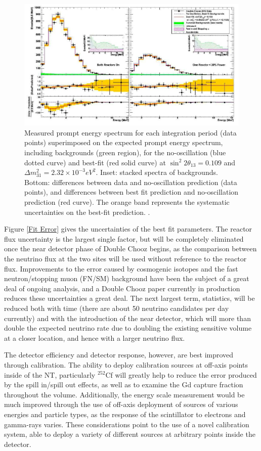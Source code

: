  \begin{figure}
 \includegraphics[width = \textwidth]{DC_Results/Best_Fit.jpg}
 \caption{Measured prompt energy spectrum for each integration period (data points) superimposed on the expected prompt
energy spectrum, including backgrounds (green region), for the no-oscillation (blue dotted curve) and best-fit (red solid curve)
at $\sin^2 2 \theta_{13} = 0.109$ and $\Delta m^2_{31}= 2.32 \times 10^{-3} eV^2$. Inset: stacked spectra of backgrounds. Bottom: differences between data
and no-oscillation prediction (data points), and differences between best fit prediction and no-oscillation prediction (red curve).
The orange band represents the systematic uncertainties on the best-fit prediction. \cite{DC_2012}.}
 \label{Best Fit}
 \end{figure}
 
Figure \ref{Fit Error} gives the uncertainties of the best fit parameters. The reactor flux uncertainty is the largest single factor, but will be completely eliminated once the near detector phase of Double Chooz begins, as the comparison between the neutrino flux at the two sites will be used without reference to the reactor flux. Improvements to the error caused by cosmogenic isotopes and the fast neutron/stopping muon (FN/SM) background have been the subject of a great deal of ongoing analysis, and a Double Chooz paper currently in production reduces these uncertainties a great deal. The next largest term, statistics, will be reduced both with time (there are about 50 neutrino candidates per day currently) and with the introduction of the near detector, which will more than double the expected neutrino rate due to doubling the existing sensitive volume at a closer location, and hence with a larger neutrino flux. 

The detector efficiency and detector response, however, are best improved through calibration. The ability to deploy calibration sources at off-axis points inside of the NT, particularly $^{252}$Cf will greatly help to reduce the error produced by the spill in/spill out effects, as well as to examine the Gd capture fraction throughout the volume. Additionally, the energy scale measurement would be much improved through the use of off-axis deployment of sources of various energies and particle types, as the response of the scintillator to electrons and gamma-rays varies. These considerations point to the use of a novel calibration system, able to deploy a variety of different sources at arbitrary points inside the detector. 

